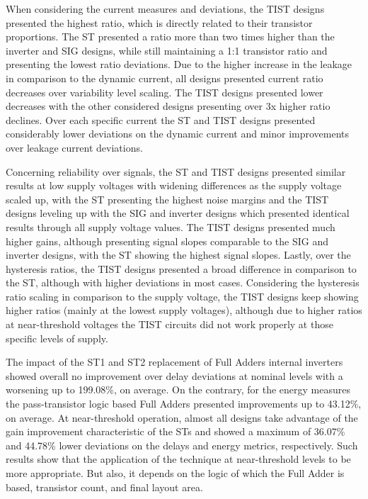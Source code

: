 \documentclass[diss,pgmicro,english]{iiufrgs}
\begin{document}
When considering the current measures and deviations, the TIST designs presented the highest ratio, which is directly related to their transistor proportions. The ST presented a ratio more than two times higher than the inverter and SIG designs, while still maintaining a 1:1 transistor ratio and presenting the lowest ratio deviations. Due to the higher increase in the leakage in comparison to the dynamic current, all designs presented current ratio decreases over variability level scaling. The TIST designs presented lower decreases with the other considered designs presenting over 3x higher ratio declines. Over each specific current the ST and TIST designs presented considerably lower deviations on the dynamic current and minor improvements over leakage current deviations.

Concerning reliability over signals, the ST and TIST designs presented similar results at low supply voltages with widening differences as the supply voltage scaled up, with the ST presenting the highest noise margins and the TIST designs leveling up with the SIG and inverter designs which presented identical results through all supply voltage values. The TIST designs presented much higher gains, although presenting signal slopes comparable to the SIG and inverter designs, with the ST showing the highest signal slopes. Lastly, over the hysteresis ratios, the TIST designs presented a broad difference in comparison to the ST, although with higher deviations in most cases. Considering the hysteresis ratio scaling in comparison to the supply voltage, the TIST designs keep showing higher ratios (mainly at the lowest supply voltages), although due to higher ratios at near-threshold voltages the TIST circuits did not work properly at those specific levels of supply.

The impact of the ST1 and ST2 replacement of Full Adders internal inverters showed overall no improvement over delay deviations at nominal levels with a worsening up to 199.08\%, on average. On the contrary, for the energy measures the pass-transistor logic based Full Adders presented improvements up to 43.12\%, on average. At near-threshold operation, almost all designs take advantage of the gain improvement characteristic of the STs and showed a maximum of 36.07\% and 44.78\% lower deviations on the delays and energy metrics, respectively. Such results show that the application of the technique at near-threshold levels to be more appropriate. But also, it depends on the logic of which the Full Adder is based, transistor count, and final layout area.
\end{document}
